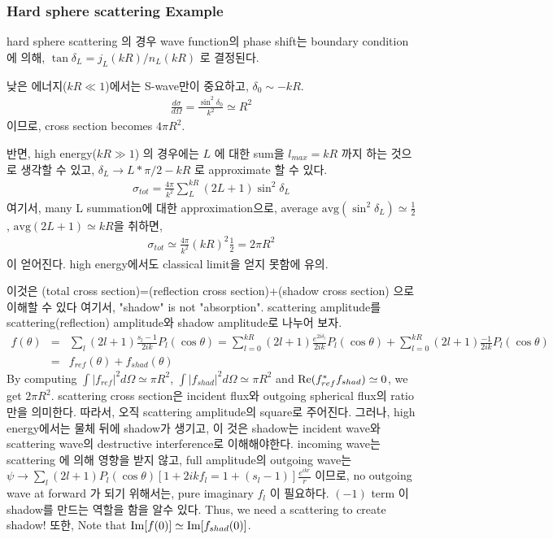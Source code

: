 \documentclass[10pt]{book}
\newcommand{\bea}{\begin{eqnarray}}
\newcommand{\eea}{\end{eqnarray}}
\newcommand{\no}{\nonumber \\}
\begin{document}
\subsubsection{Hard sphere scattering Example}
hard sphere scattering 의 경우
wave function의 phase shift는 boundary condition에 의해,
$\tan\delta_L=j_L(kR)/n_L(kR)$ 로 결정된다. 

낮은 에너지($kR\ll 1$)에서는 S-wave만이 중요하고, $\delta_0\sim -k R$.
\bea
\frac{d\sigma}{d\Omega}=\frac{\sin^2\delta_0}{k^2}\simeq R^2
\eea
이므로, cross section becomes $4\pi R^2$.

반면,
high energy($kR\gg 1$) 의 경우에는 $L$ 에 대한 sum을 $l_{max}=kR$ 까지
하는 것으로 생각할 수 있고,
$\delta_L\to L*\pi/2-kR$ 로 approximate 할 수 있다. 
\bea
\sigma_{tot}=\frac{4\pi}{k^2}\sum_L^{kR} (2L+1)\sin^2\delta_L
\eea  
여기서, many L summation에 대한 approximation으로,
average $ \mbox{avg}(\sin^2\delta_L)\simeq \frac{1}{2}$,
$\mbox{avg}(2L+1)\simeq kR$을 취하면,
\bea
\sigma_{tot}\simeq \frac{4\pi}{k^2}(kR)^2\frac{1}{2}=2\pi R^2
\eea  
이 얻어진다. high energy에서도 classical limit을 얻지 못함에 유의.

이것은 
(total cross section)=(reflection cross section)+(shadow cross section)
으로 이해할 수 있다
여기서, "shadow" is not "absorption". scattering amplitude를
scattering(reflection) amplitude와 shadow amplitude로 나누어 보자.
\bea
f(\theta)&=&\sum_l (2l+1)\frac{s_l-1}{2ik} P_l(\cos\theta)
         =\sum_{l=0}^{kR} (2l+1)\frac{e^{2i\delta_l}}{2ik} P_l(\cos\theta)
         +\sum_{l=0}^{kR} (2l+1)\frac{-1}{2ik} P_l(\cos\theta)\no
         &=&f_{ref}(\theta)+f_{shad}(\theta)   
\eea
By computing $\int |f_{ref}|^2 d\Omega\simeq \pi R^2 $, 
$\int |f_{shad}|^2 d\Omega\simeq \pi R^2 $ and
${\rm Re}(f_{ref}^* f_{shad})\simeq 0$, we get $2\pi R^2$. scattering cross section은 
incident flux와 outgoing spherical flux의 ratio만을 의미한다. 따라서, 오직 scattering amplitude의 
square로 주어진다. 그러나, high energy에서는 물체 뒤에 shadow가 생기고, 
 이 것은 shadow는 incident wave와 scattering wave의 destructive interference로 이해해야한다.
incoming wave는 scattering 에 의해 영향을 받지 않고,
full amplitude의 outgoing wave는 
$\psi\to \sum _l (2l+1) P_l(\cos\theta)[1+2ik f_l=1+(s_l-1) ]\frac{e^{ikr}}{r}$ 이므로, 
no outgoing wave at forward 가 되기 위해서는, pure imaginary $f_l$ 이 필요하다.
$(-1)$ term 이 shadow를 만드는 역할을 함을 알수 있다. 
Thus, we need a scattering 
to create shadow! 또한, Note that ${\rm Im} [f(0)]\simeq {\rm Im} [f_{shad}(0)]$.
\end{document}
